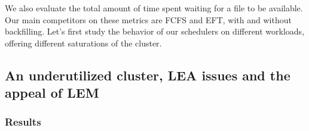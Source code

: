 \documentclass[conference,10pt]{IEEEtran}
\newcommand{\emptyflow}{\mathit{ReferenceFlow}\xspace}
\begin{document}

We also evaluate the total amount of time spent waiting for a file to be available.
Our main competitors on these metrics are FCFS and EFT, with and without backfilling.
Let's first study the behavior of our schedulers on different workloads,
offering different saturations of the cluster.

\subsection{An underutilized cluster, LEA issues and the appeal of LEM}\label{sec.07-16}

\subsubsection{Results}
\end{document}
